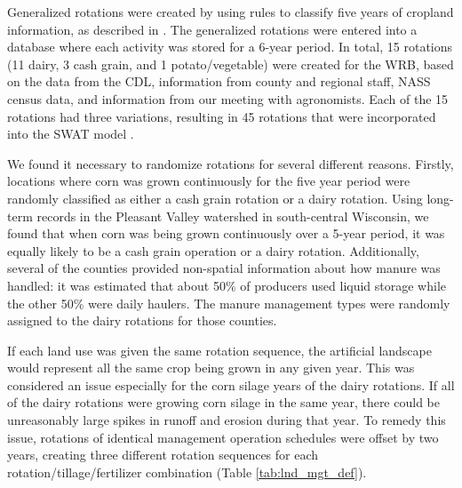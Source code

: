 Generalized rotations were created by using rules to classify five years of cropland information, as described in .  
The generalized rotations were entered into a database where each activity was stored for a 6-year
period. In total, 15 rotations (11 dairy, 3 cash grain, and 1 potato/vegetable) were created for the WRB,
based on the data from the CDL, information from county and regional staff, NASS census data, and
information from our meeting with agronomists. Each of the 15 rotations had three
variations, resulting in 45 rotations that were incorporated into the SWAT model .


We found it necessary to randomize rotations for several different reasons. Firstly, locations where corn was grown continuously for the five year period were randomly classified as either a cash grain rotation or a dairy rotation. Using long-term records in the Pleasant Valley watershed in south-central Wisconsin, we found that when corn was being grown continuously over a 5-year period, it was equally likely to be a cash grain operation or a dairy rotation. Additionally, several of the counties provided non-spatial information about how manure was handled: it was estimated that about 50\% of producers used liquid storage while the other 50\% were daily haulers. The manure management types were randomly assigned to the dairy rotations for those counties.  

If each land use was given the same rotation sequence, the artificial landscape would represent all the same crop being grown in any given year. This was considered an issue especially for the corn silage years of the dairy rotations. If all of the dairy rotations were growing corn silage in the same year, there could be unreasonably large spikes in runoff and erosion during that year. To remedy this issue, rotations of identical management operation schedules were offset by two years, creating three different rotation sequences for each rotation/tillage/fertilizer combination (Table \ref{tab:lnd_mgt_def}).

